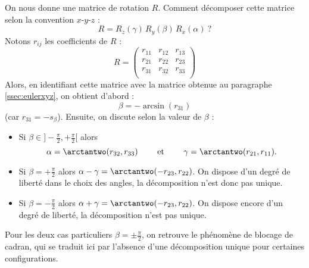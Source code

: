 \documentclass[11pt,class=report,crop=false]{standalone}
\begin{document}
On nous donne une matrice de rotation $R$. Comment décomposer cette matrice selon la convention $x$-$y$-$z$ :
$$R = R_z(\gamma) \, R_y(\beta) \, R_x(\alpha) \ ?$$
Notons $r_{ij}$ les coefficients de $R$ :
$$R = \begin{pmatrix}
r_{11} & r_{12} & r_{13} \\
r_{21} & r_{22} & r_{23} \\
r_{31} & r_{32} & r_{33} \\
\end{pmatrix}$$
Alors, en identifiant cette matrice avec la matrice obtenue au paragraphe \ref{ssec:eulerxyz}, on obtient d'abord :
$$\beta = -\arcsin(r_{31})$$
(car $r_{31} = -s_\beta $).
Ensuite, on discute selon la valeur de $\beta$ :
\begin{itemize}
  \item Si $\beta \in {}]-\frac\pi2, +\frac\pi2[$ alors
  $$\alpha = \arctantwo(r_{32},r_{33}) \qquad \text{ et } \qquad \gamma = \arctantwo(r_{21},r_{11}).$$

  \item Si $\beta = +\frac\pi2$ alors $\alpha-\gamma = \arctantwo(-r_{23},r_{22})$.
  On dispose d'un degré de liberté dans le choix des angles, la décomposition n'est donc pas unique.

  \item Si $\beta = -\frac\pi2$ alors $\alpha+\gamma = \arctantwo(-r_{23},r_{22})$.
  On dispose encore d'un degré de liberté, la décomposition n'est pas unique.
\end{itemize}

Pour les deux cas particuliers $\beta = \pm \frac\pi2$, on retrouve le phénomène de blocage de cadran, qui se traduit ici par l'absence d'une décomposition unique pour certaines configurations.
\end{document}
